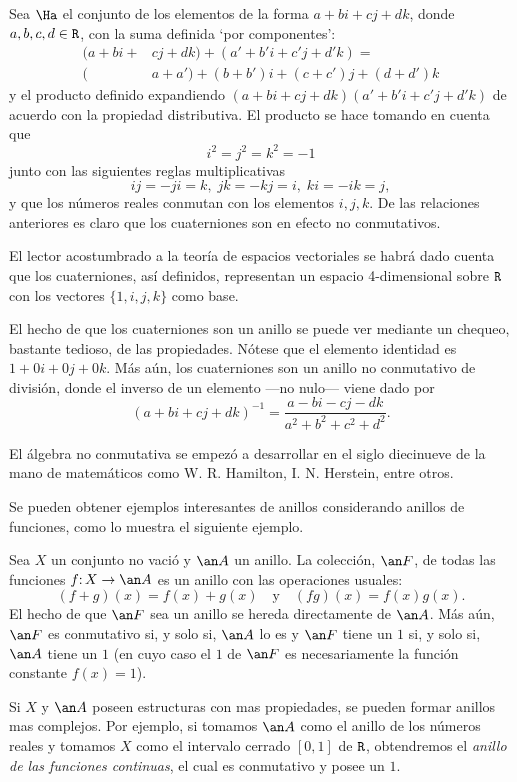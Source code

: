 \begin{ejem} 
	Sea $\Ha$ el conjunto de los elementos de la forma $a + bi + cj + dk$, donde $a,b,c,d \in \texttt{R}$, con la suma definida `por componentes':
	\begin{align*}
	(a + bi + &cj + dk)+(a' + b'i + c'j + d'k) = \\ (&a+a') + (b+b')i + (c+c')j + (d+d')k 
	\end{align*}
	y el producto definido expandiendo $(a + bi + cj + dk)(a' + b'i + c'j + d'k)$ de acuerdo con la propiedad distributiva.  El producto se hace tomando en cuenta que
	\[  i^2=j^2=k^2=-1 \]
	junto con las siguientes reglas multiplicativas
	\[ ij=-ji=k, \; jk=-kj=i, \; ki=-ik=j, \]
	y que los números reales conmutan con los elementos $i,j,k$. De las relaciones anteriores es claro que los cuaterniones son en efecto no conmutativos. 
\begin{nota}
	El lector acostumbrado a la teoría de espacios vectoriales se habrá dado cuenta que los cuaterniones, así definidos, representan un espacio 4-di\-mensional sobre $\texttt{R}$ con los vectores $\{1,i,j,k\}$ como base.
\end{nota}
	El hecho de que los cuaterniones son un anillo se puede ver mediante un chequeo, bastante tedioso, de las propiedades. Nótese que el elemento identidad es $1 + 0i + 0j +0k$. Más aún, los cuaterniones son un anillo no conmutativo de división, donde el inverso de un elemento ---no nulo--- viene dado por  
	\[ (a + bi + cj + dk)^{-1} = \frac{a - bi - cj - dk}{a^2+b^2+c^2+d^2}. \]
\end{ejem} 
\begin{nota}
	El álgebra no conmutativa se empezó a desarrollar en el siglo diecinueve de la mano de matemáticos como  W. R. Hamilton\footnotemark, I. N. Herstein, entre otros.
\end{nota}
Se pueden obtener ejemplos interesantes de anillos considerando anillos de funciones, como lo muestra el siguiente ejemplo.
\begin{ejem} \label{ejemap} 
	Sea $X$ un conjunto no vació y $\an A$ un anillo. La colección, $\an F$, de todas las funciones $f\mathpunct{:} X \to\an A$
	es un anillo con las operaciones usuales: 
	\[ (f+g)(x) = f(x)+g(x) \quad \text{y} \quad (fg)(x) = f(x)g(x). \]
	El hecho de que $\an F$ sea un anillo se hereda directamente de $\an A$. Más aún, $\an F$ es conmutativo si, y solo si, $\an A$ lo es y $\an F$ tiene un $1$ si, y solo si, $\an A$ tiene un $1$ (en cuyo caso el $1$ de $\an F$ es necesariamente la función constante $f(x)=1$).
	
	Si $X$ y $\an A$ poseen estructuras con mas propiedades, se pueden formar anillos mas complejos. Por ejemplo, si tomamos $\an A$ como el anillo de los números reales y tomamos $X$ como el intervalo cerrado $[0,1]$ de $\texttt{R}$, obtendremos el \textit{anillo de las funciones continuas}, el cual es conmutativo y posee un $1$.  
\end{ejem}
